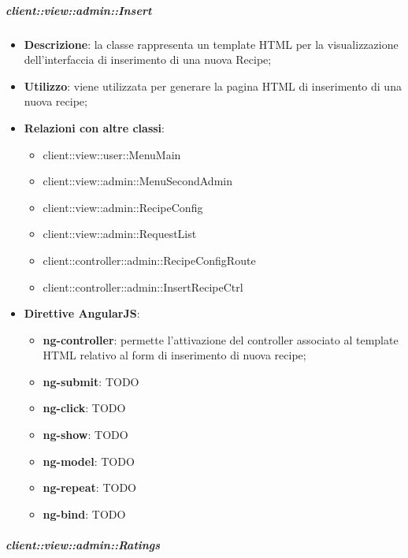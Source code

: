 		\subparagraph{client::view::admin::Insert} %
		\label{subp:bdsm_app_client_view_admin_insert}

			\begin{itemize}
				\item \textbf{Descrizione}: la classe rappresenta un template HTML per la visualizzazione dell'interfaccia di inserimento di una nuova Recipe;
				\item \textbf{Utilizzo}: viene utilizzata per generare la pagina HTML di inserimento di una nuova recipe;
				\item \textbf{Relazioni con altre classi}:
					\begin{itemize}
						\item client::view::user::MenuMain
						\item client::view::admin::MenuSecondAdmin
						\item client::view::admin::RecipeConfig
						\item client::view::admin::RequestList
						\item client::controller::admin::RecipeConfigRoute
						\item client::controller::admin::InsertRecipeCtrl
					\end{itemize}
				\item \textbf{Direttive AngularJS}:
					\begin{itemize}
						\item \textbf{ng-controller}: permette l'attivazione del controller associato al template HTML relativo al form di inserimento di nuova recipe;
						\item \textbf{ng-submit}: TODO
						\item \textbf{ng-click}: TODO
						\item \textbf{ng-show}: TODO
						\item \textbf{ng-model}: TODO
						\item \textbf{ng-repeat}: TODO
						\item \textbf{ng-bind}: TODO
					\end{itemize}
			\end{itemize}

		\subparagraph{client::view::admin::Ratings} %
		\label{subp:bdsm_app_client_view_admin_ratings}

